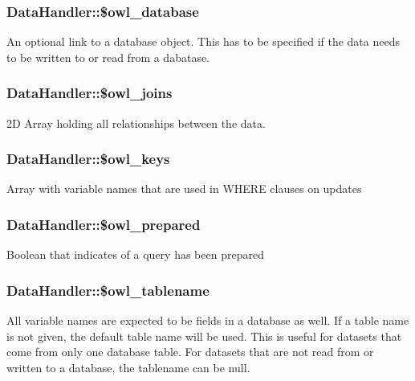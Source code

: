 \subsubsection[{\$owl\_\-database}]{\setlength{\rightskip}{0pt plus 5cm}DataHandler::\$owl\_\-database}\label{classDataHandler_a3ac49aa018e0ebe4c74f5a636d455a8b}
An optional link to a database object. This has to be specified if the data needs to be written to or read from a dabatase. 
\subsubsection[{\$owl\_\-joins}]{\setlength{\rightskip}{0pt plus 5cm}DataHandler::\$owl\_\-joins}\label{classDataHandler_ada9b697f81ea82d269077f9c7445791d}
2D Array holding all relationships between the data. 
\subsubsection[{\$owl\_\-keys}]{\setlength{\rightskip}{0pt plus 5cm}DataHandler::\$owl\_\-keys}\label{classDataHandler_a8d398720bce975159b2d13ad7a941bc7}
Array with variable names that are used in WHERE clauses on updates 
\subsubsection[{\$owl\_\-prepared}]{\setlength{\rightskip}{0pt plus 5cm}DataHandler::\$owl\_\-prepared}\label{classDataHandler_ae6093d21291ed3ab3183e11962452928}
Boolean that indicates of a query has been prepared 
\subsubsection[{\$owl\_\-tablename}]{\setlength{\rightskip}{0pt plus 5cm}DataHandler::\$owl\_\-tablename}\label{classDataHandler_a24620784bde262bdd02227962d3b9605}
All variable names are expected to be fields in a database as well. If a table name is not given, the default table name will be used. This is useful for datasets that come from only one database table. For datasets that are not read from or written to a database, the tablename can be null. 
